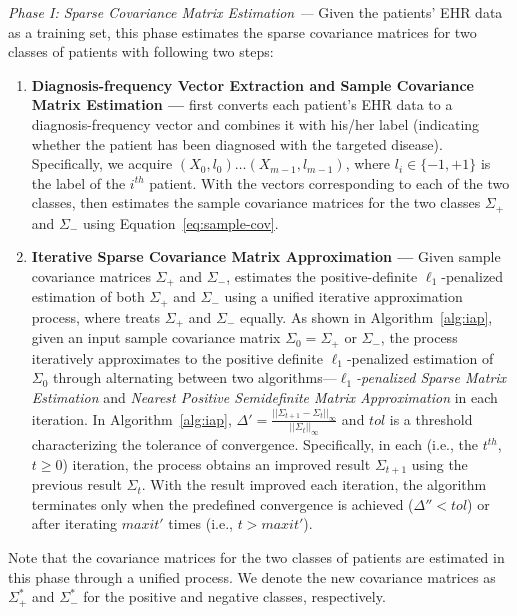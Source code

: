 \emph{Phase I: Sparse Covariance Matrix Estimation --- } Given the patients' EHR data as a training set, this phase estimates the sparse covariance matrices for two classes of patients with following two steps:
\begin{enumerate}

    \item \textbf{Diagnosis-frequency Vector Extraction and Sample Covariance Matrix Estimation --- } \TheName{} first converts each patient's EHR data to a diagnosis-frequency vector and combines it with his/her label (indicating whether the patient has been diagnosed with the targeted disease).
Specifically, we acquire $(X_0,l_0)\dots (X_{m-1},l_{m-1})$, where $l_i\in\{-1,+1\}$ is the label of the $i^{th}$ patient.
With the vectors corresponding to each of the two classes, \TheName{} then estimates the sample covariance matrices for the two classes $\Sigma_+$ and $\Sigma_-$ using Equation~\ref{eq:sample-cov}.  


    \item \textbf{Iterative Sparse Covariance Matrix Approximation --- } Given sample covariance matrices $\Sigma_+$ and $\Sigma_-$, \TheName{} estimates the positive-definite $\ell_1$-penalized estimation of both $\Sigma_+$ and $\Sigma_-$ using a unified iterative approximation process, where \TheName{} treats $\Sigma_+$ and $\Sigma_-$ equally.
     As shown in Algorithm~\ref{alg:iap}, given an input sample covariance matrix $\Sigma_0=\Sigma_+$ or $\Sigma_-$, the process iteratively approximates to the positive definite $\ell_1$-penalized estimation of $\Sigma_0$ through alternating between two algorithms---\emph{$\ell_1$-penalized Sparse Matrix Estimation} and \emph{Nearest Positive Semidefinite Matrix Approximation} in each iteration.
In Algorithm~\ref{alg:iap}, $\Delta'=\frac{||\Sigma_{t+1}-\Sigma_{t}||_\infty}{||\Sigma_{t}||_\infty}$ and $tol$ is a threshold characterizing the tolerance of convergence.
     Specifically, in each (i.e., the $t^{th}$, $t\geq 0$) iteration, the process obtains an improved result $\Sigma_{t+1}$ using the previous result $\Sigma_{t}$.
     With the result improved each iteration, the algorithm terminates only when the predefined convergence is achieved ($\Delta''< tol$) or after iterating $maxit'$ times (i.e., $t>maxit'$).
 

\end{enumerate}
Note that the covariance matrices for the two classes of patients are estimated in this phase through a unified process.
We denote the new covariance matrices as $\Sigma_+^*$ and $\Sigma_-^*$ for the positive and negative classes, respectively.

